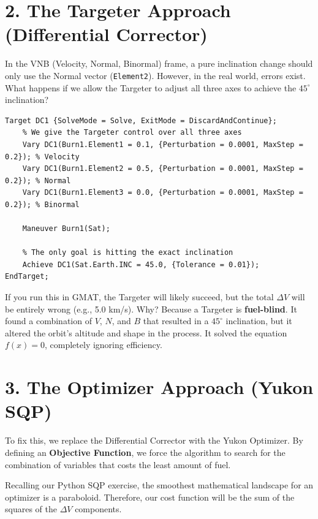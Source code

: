 \documentclass[11pt, letterpaper]{article}
\begin{document}
\section*{2. The Targeter Approach (Differential Corrector)}
In the VNB (Velocity, Normal, Binormal) frame, a pure inclination change should only use the Normal vector (\texttt{Element2}). However, in the real world, errors exist. What happens if we allow the Targeter to adjust all three axes to achieve the $45^\circ$ inclination?

\begin{lstlisting}[caption=The Targeter Sequence]
Target DC1 {SolveMode = Solve, ExitMode = DiscardAndContinue};
    % We give the Targeter control over all three axes
    Vary DC1(Burn1.Element1 = 0.1, {Perturbation = 0.0001, MaxStep = 0.2}); % Velocity
    Vary DC1(Burn1.Element2 = 0.5, {Perturbation = 0.0001, MaxStep = 0.2}); % Normal
    Vary DC1(Burn1.Element3 = 0.0, {Perturbation = 0.0001, MaxStep = 0.2}); % Binormal
    
    Maneuver Burn1(Sat);
    
    % The only goal is hitting the exact inclination
    Achieve DC1(Sat.Earth.INC = 45.0, {Tolerance = 0.01});
EndTarget;
\end{lstlisting}

\begin{tcolorbox}[colback=red!5!white,colframe=red!75!black,title=The Targeter's Flaw]
If you run this in GMAT, the Targeter will likely succeed, but the total $\Delta V$ will be entirely wrong (e.g., 5.0 km/s). Why? Because a Targeter is \textbf{fuel-blind}. It found a combination of $V$, $N$, and $B$ that resulted in a $45^\circ$ inclination, but it altered the orbit's altitude and shape in the process. It solved the equation $f(x) = 0$, completely ignoring efficiency.
\end{tcolorbox}

\section*{3. The Optimizer Approach (Yukon SQP)}
To fix this, we replace the Differential Corrector with the Yukon Optimizer. By defining an \textbf{Objective Function}, we force the algorithm to search for the combination of variables that costs the least amount of fuel. 

Recalling our Python SQP exercise, the smoothest mathematical landscape for an optimizer is a paraboloid. Therefore, our cost function will be the sum of the squares of the $\Delta V$ components.
\end{document}
